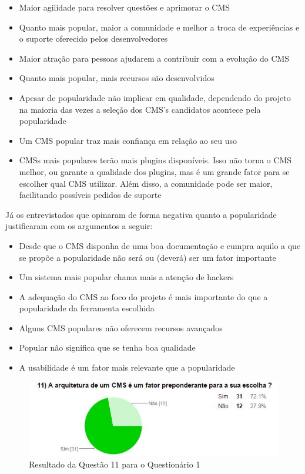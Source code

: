 \begin{itemize}
    \item  Maior agilidade para resolver questões e aprimorar o CMS
    \item Quanto mais popular, maior a comunidade e melhor a troca de experiências e o suporte oferecido pelos desenvolvedores  
    \item Maior atração para pessoas ajudarem a contribuir com a evolução do CMS
    \item Quanto mais popular, mais recursos são desenvolvidos
    \item Apesar de popularidade não implicar em qualidade, dependendo do projeto na maioria das vezes a seleção dos CMS's candidatos acontece pela popularidade
    \item Um CMS popular traz mais confiança em relação ao seu uso
    \item CMSs mais populares terão mais plugins disponíveis. Isso não torna o CMS melhor, ou garante a qualidade dos plugins, mas é um grande fator para se escolher qual CMS utilizar. Além disso, a comunidade pode ser maior, facilitando possíveis pedidos de suporte  
      
    \end{itemize}

Já os entrevistados que opinaram de forma negativa quanto a popularidade justificaram com os argumentos a seguir:

\begin{itemize}
\item Desde que o CMS disponha de uma boa documentação e cumpra aquilo a que se propõe a popularidade não será ou (deverá) ser um fator importante
\item Um sistema mais popular chama mais a atenção de hackers
\item A adequação do CMS ao foco do projeto é mais importante do que a popularidade da ferramenta escolhida
\item Alguns CMS populares não oferecem recursos avançados
\item Popular não significa que se tenha boa qualidade
\item A usabilidade é um fator mais relevante que a popularidade
\end{itemize}


\begin{figure}[!th]
\centering
\includegraphics[keepaspectratio=true,scale=0.9]{figuras/Ques_1/q11.jpg}
\caption{Resultado da Questão 11 para o Questionário 1}
\label{Q11_Q1}
\end{figure}


